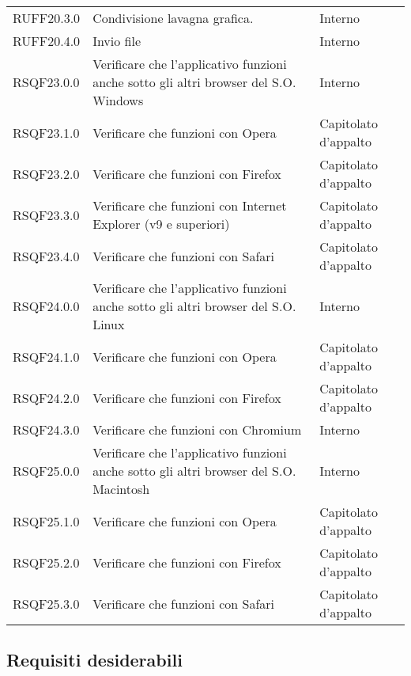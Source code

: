 \begin{longtable}{lp{}l}
RUFF20.3.0 & Condivisione lavagna grafica. & Interno \\
RUFF20.4.0 & Invio file & Interno \\
RSQF23.0.0 & Verificare che l'applicativo funzioni anche sotto gli altri browser del S.O. Windows & Interno \\
RSQF23.1.0 & Verificare che funzioni con Opera & Capitolato d'appalto \\
RSQF23.2.0 & Verificare che funzioni con Firefox & Capitolato d'appalto \\
RSQF23.3.0 & Verificare che funzioni con Internet Explorer (v9 e superiori) & Capitolato d'appalto \\
RSQF23.4.0 & Verificare che funzioni con Safari & Capitolato d'appalto \\
RSQF24.0.0 & Verificare che l'applicativo funzioni anche sotto gli altri browser del S.O. Linux & Interno \\
RSQF24.1.0 & Verificare che funzioni con Opera & Capitolato d'appalto \\
RSQF24.2.0 & Verificare che funzioni con Firefox & Capitolato d'appalto \\
RSQF24.3.0 & Verificare che funzioni con Chromium & Interno \\
RSQF25.0.0 & Verificare che l'applicativo funzioni anche sotto gli altri browser del S.O. Macintosh & Interno \\
RSQF25.1.0 & Verificare che funzioni con Opera & Capitolato d'appalto \\
RSQF25.2.0 & Verificare che funzioni con Firefox & Capitolato d'appalto \\
RSQF25.3.0 & Verificare che funzioni con Safari & Capitolato d'appalto \\
\bottomrule
\end{longtable}
\subsection{Requisiti desiderabili}

